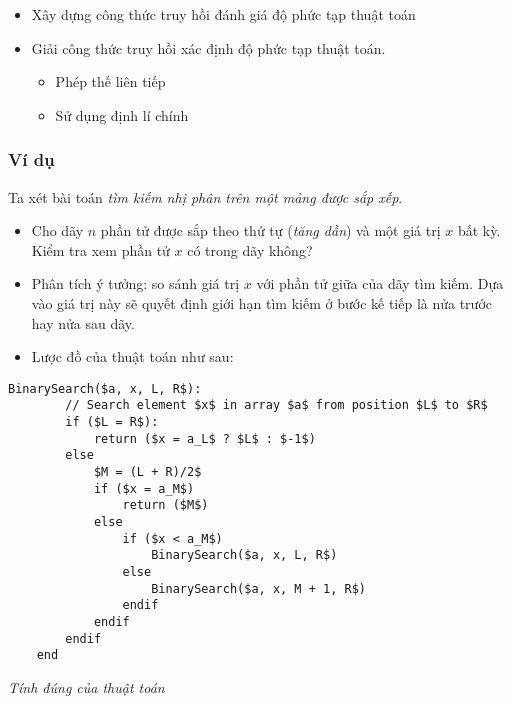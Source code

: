 \begin{itemize}
    \item Xây dựng công thức truy hồi đánh giá độ phức tạp thuật toán
    \item Giải công thức truy hồi xác định độ phức tạp thuật toán.
        \begin{itemize}
            \item Phép thế liên tiếp
            \item Sử dụng định lí chính
        \end{itemize}
\end{itemize}


\subsubsection{Ví dụ}
Ta xét bài toán \textit{tìm kiếm nhị phân trên một mảng được sắp xếp}.

\begin{itemize}
    \item Cho dãy $n$ phần tử được sắp theo thứ tự (\textit{tăng dần}) và một giá trị $x$ 
    bất kỳ. Kiểm tra xem phần tử  $x$ có trong dãy không?

    \item Phân tích ý tưởng: so sánh giá trị $x$ với phần tử giữa của dãy tìm kiếm. Dựa
    vào giá trị này sẽ quyết định giới hạn tìm kiếm ở bước kế tiếp là nửa trước
    hay nửa sau dãy.

    \item Lược đồ của thuật toán như sau:

\end{itemize}

\begin{lstlisting}[style=algo]
    BinarySearch($a, x, L, R$):
        // Search element $x$ in array $a$ from position $L$ to $R$
        if ($L = R$):
            return ($x = a_L$ ? $L$ : $-1$)
        else
            $M = (L + R)/2$
            if ($x = a_M$) 
                return ($M$)
            else
                if ($x < a_M$)
                    BinarySearch($a, x, L, R$)
                else 
                    BinarySearch($a, x, M + 1, R$)
                endif
            endif
        endif
    end
\end{lstlisting}

\textit{Tính đúng của thuật toán}

